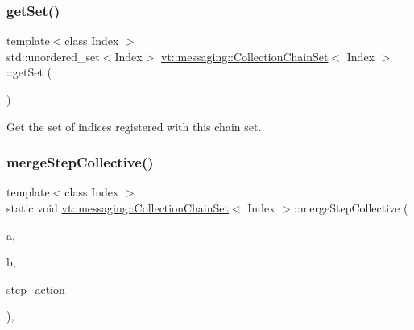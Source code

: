 \mbox{\label{classvt_1_1messaging_1_1_collection_chain_set_a17bcba0392b2ae7c68a3c3630b71ffa3}} 
\subsubsection{\texorpdfstring{get\+Set()}{getSet()}}
{\footnotesize\ttfamily template$<$class Index $>$ \\
std\+::unordered\+\_\+set$<$Index$>$ \hyperlink{classvt_1_1messaging_1_1_collection_chain_set}{vt\+::messaging\+::\+Collection\+Chain\+Set}$<$ Index $>$\+::get\+Set (\begin{DoxyParamCaption}{ }\end{DoxyParamCaption})\hspace{0.3cm}{\ttfamily [inline]}}



Get the set of indices registered with this chain set. 

\mbox{\label{classvt_1_1messaging_1_1_collection_chain_set_a982745c451229365b57a15a87dc2999e}} 
\subsubsection{\texorpdfstring{merge\+Step\+Collective()}{mergeStepCollective()}\hspace{0.1cm}{\footnotesize\ttfamily [1/2]}}
{\footnotesize\ttfamily template$<$class Index $>$ \\
static void \hyperlink{classvt_1_1messaging_1_1_collection_chain_set}{vt\+::messaging\+::\+Collection\+Chain\+Set}$<$ Index $>$\+::merge\+Step\+Collective (\begin{DoxyParamCaption}\item[{\hyperlink{classvt_1_1messaging_1_1_collection_chain_set}{Collection\+Chain\+Set}$<$ Index $>$ \&}]{a,  }\item[{\hyperlink{classvt_1_1messaging_1_1_collection_chain_set}{Collection\+Chain\+Set}$<$ Index $>$ \&}]{b,  }\item[{std\+::function$<$ \hyperlink{structvt_1_1messaging_1_1_pending_send}{Pending\+Send}(Index)$>$}]{step\+\_\+action }\end{DoxyParamCaption})\hspace{0.3cm}{\ttfamily [inline]}, {\ttfamily [static]}}




